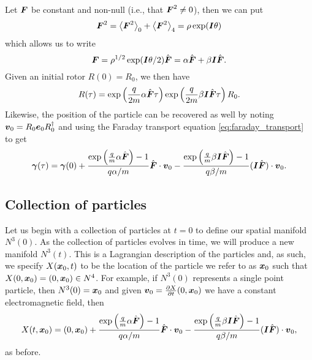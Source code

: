 \documentclass[conf]{new-aiaa}
\begin{document}
Let $\blade{F}$ be constant and non-null (i.e., that $\blade{F}^2\neq 0$), then we can put
\begin{equation}
\blade{F}^2 = \proj{0}{\blade{F}^2}+\proj{4}{\blade{F}^2}=\rho \exp(\blade{I}\theta)
\end{equation}
which allows us to write 
\begin{equation}
\blade{F}=\rho^{1/2}\exp(\blade{I}\theta/2)\hat{\blade{F}}=\alpha \hat{\blade{F}}+\beta\blade{I} \hat{\blade{F}}.
\end{equation}
Given an initial rotor $R(0)=R_0$, we then have
\begin{equation}
R(\tau)=\exp\left(\frac{q}{2m}\alpha \hat{\blade{F}}\tau\right)\exp\left(\frac{q}{2m}\beta\blade{I}\hat{\blade{F}}\tau\right)R_0.
\end{equation}
Likewise, the position of the particle can be recovered as well by noting $\blade{v}_0=R_0\blade{e}_0 R_0^\dagger$ and using the Faraday transport equation \cref{eq:faraday_transport} to get
\begin{equation}
\blade{\gamma}(\tau) = \blade{\gamma}(0)+\frac{\exp\left(\frac{q}{m}\alpha \hat{\blade{F}}\right)-1}{q\alpha/m} \hat{\blade{F}}\cdot \blade{v}_0 - \frac{\exp\left(\frac{q}{m}\beta \blade{I}\hat{\blade{F}}\right)-1}{q\beta/m}(\blade{I}\hat{\blade{F}})\cdot \blade{v}_0.
\end{equation}


\subsection{Collection of particles}

Let us begin with a collection of particles at $t=0$ to define our spatial manifold $N^3(0)$. As the collection of particles evolves in time, we will produce a new manifold $N^3(t)$. This is a Lagrangian description of the particles and, as such, we specify $X(\blade{x}_0,t)$ to be the location of the particle we refer to as $\blade{x}_0$ such that $X(0,\blade{x}_0)=(0,\blade{x}_0)\in N^4$. For example, if $N^3(0)$ represents a single point particle, then $N^3(0)=\blade{x}_0$ and given $\blade{v}_0=\frac{\partial X}{\partial t}(0,\blade{x}_0)$ we have a constant electromagnetic field, then
\begin{equation}
X(t,\blade{x}_0)=(0,\blade{x}_0)+\frac{\exp\left(\frac{q}{m}\alpha \hat{\blade{F}}\right)-1}{q\alpha/m} \hat{\blade{F}}\cdot \blade{v}_0 - \frac{\exp\left(\frac{q}{m}\beta \blade{I}\hat{\blade{F}}\right)-1}{q\beta/m}(\blade{I}\hat{\blade{F}})\cdot \blade{v}_0,
\end{equation}
as before.
\end{document}
